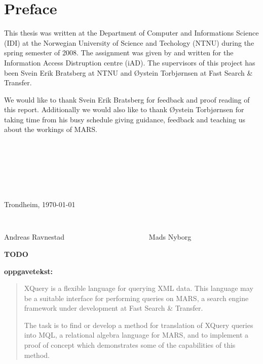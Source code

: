 \chapter*{Preface}

This thesis was written at the Department of Computer and Informations Science
(IDI) at the Norwegian University of Science and Techology (NTNU) during the
spring semester of 2008. The assignment was given by and written for the
Information Access Distruption centre (iAD). The supervisors of this project
has been Svein Erik Bratsberg at NTNU and \O ystein Torbj\o rnsen at Fast
Search \& Transfer.

We would like to thank Svein Erik Bratsberg for feedback and proof reading of
this report. Additionally we would also like to thank \O ystein Torbj\o rnsen
for taking time from his busy schedule giving guidance, feedback and teaching
us about the workings of MARS.

\begin{verbatim}







\end{verbatim}
\begin{center}

Trondheim, \today

\begin{verbatim}


\end{verbatim}
Andreas Ravnestad \verb!                      ! Mads Nyborg
\end{center}

\textbf{\LARGE TODO} 

\textbf{\Large oppgavetekst:} 

\begin{quote}
XQuery is a flexible language for querying XML data. This language may be a
suitable interface for performing queries on MARS, a search engine
framework under development at Fast Search \& Transfer.

The task is to find or develop a method for translation of XQuery queries into
MQL, a relational algebra language for MARS, and to implement a proof of concept which
demonstrates some of the capabilities of this method.

\end{quote}

